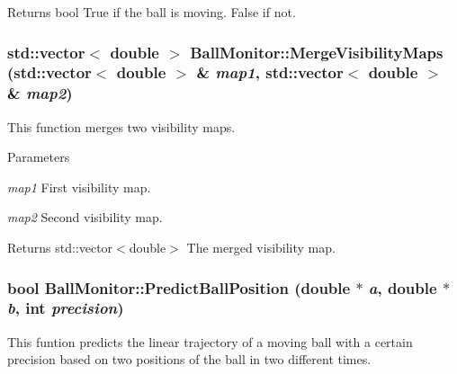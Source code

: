 \begin{DoxyReturn}{Returns}
bool True if the ball is moving. False if not. 
\end{DoxyReturn}
\hypertarget{classBallMonitor_a74f8a1ce881528e475269fa1c964fa61}{
\subsubsection[{MergeVisibilityMaps}]{\setlength{\rightskip}{0pt plus 5cm}std::vector$<$ double $>$ BallMonitor::MergeVisibilityMaps (std::vector$<$ double $>$ \& {\em map1}, \/  std::vector$<$ double $>$ \& {\em map2})}}
\label{classBallMonitor_a74f8a1ce881528e475269fa1c964fa61}


This function merges two visibility maps. 


\begin{DoxyParams}{Parameters}
\item[{\em map1}]First visibility map. \item[{\em map2}]Second visibility map. \end{DoxyParams}
\begin{DoxyReturn}{Returns}
std::vector$<$double$>$ The merged visibility map. 
\end{DoxyReturn}
\hypertarget{classBallMonitor_a914053314023ea79ee691a3031e355bf}{
\subsubsection[{PredictBallPosition}]{\setlength{\rightskip}{0pt plus 5cm}bool BallMonitor::PredictBallPosition (double $\ast$ {\em a}, \/  double $\ast$ {\em b}, \/  int {\em precision})}}
\label{classBallMonitor_a914053314023ea79ee691a3031e355bf}


This funtion predicts the linear trajectory of a moving ball with a certain precision based on two positions of the ball in two different times. 


